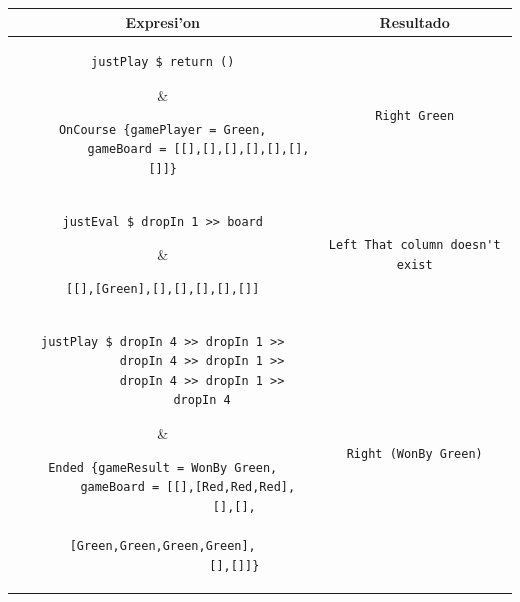 \documentclass[a4paper]{article}
\begin{document}
\lstset{language=haskell, frame=none, tabsize=4}
	\begin{table}[hp]
		\begin{center}
			\begin{tabular}{@{} cc @{}}
				\toprule
				Expresi'on & Resultado \\ 
				\midrule
\begin{lstlisting}
justPlay $ return ()
\end{lstlisting} &
\begin{lstlisting}
OnCourse {gamePlayer = Green,
          gameBoard = [[],[],[],[],[],[],[]]}
\end{lstlisting} \\[1.5em]

\begin{lstlisting}
justEval $ player
\end{lstlisting} &
\begin{lstlisting}
Right Green
\end{lstlisting} \\[1.5em]

\begin{lstlisting}
justEval $ dropIn 1 >> board
\end{lstlisting} &
\begin{lstlisting}
[[],[Green],[],[],[],[],[]]
\end{lstlisting} \\[1.5em]

\begin{lstlisting}
justEval $ dropIn 7
\end{lstlisting} &
\begin{lstlisting}
Left That column doesn't exist
\end{lstlisting} \\[1.5em]

\begin{lstlisting}
justPlay $ dropIn 4 >> dropIn 1 >>
           dropIn 4 >> dropIn 1 >>
           dropIn 4 >> dropIn 1 >>
           dropIn 4
\end{lstlisting} &
\begin{lstlisting}
Ended {gameResult = WonBy Green,
       gameBoard = [[],[Red,Red,Red],
                    [],[],
                    [Green,Green,Green,Green],
                    [],[]]}
\end{lstlisting} \\[1.5em]

\begin{lstlisting}
justEval $ dropIn 4 >> dropIn 1 >>
           dropIn 4 >> dropIn 1 >>
           dropIn 4 >> dropIn 1 >>
           dropIn 4 >> result
\end{lstlisting} &
\begin{lstlisting}
Right (WonBy Green)
\end{lstlisting} \\[1.5em]


\end{tabular}
\end{center}
\end{table}
\end{document}
